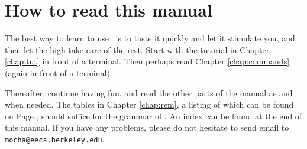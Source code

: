 \section{How to read this manual}
The best way to learn to use \mocha\ is to taste it quickly
and let it stimulate you, and then let the high take care of the
rest. Start with the tutorial in Chapter \ref{chap:tut} in front of a
terminal. Then perhaps read Chapter \ref{chap:commands} (again in
front of a terminal). 

Thereafter, continue having fun, and read the other parts of the
manual as and when needed. The tables in Chapter \ref{chap:rem}, a
listing of which can be found on Page \pageref{page:tables}, should
suffice for the grammar of \rem. An index can be found at the end of
this manual. If you have any problems, please do not
hesitate to send email to {\tt mocha@eecs.berkeley.edu}.

